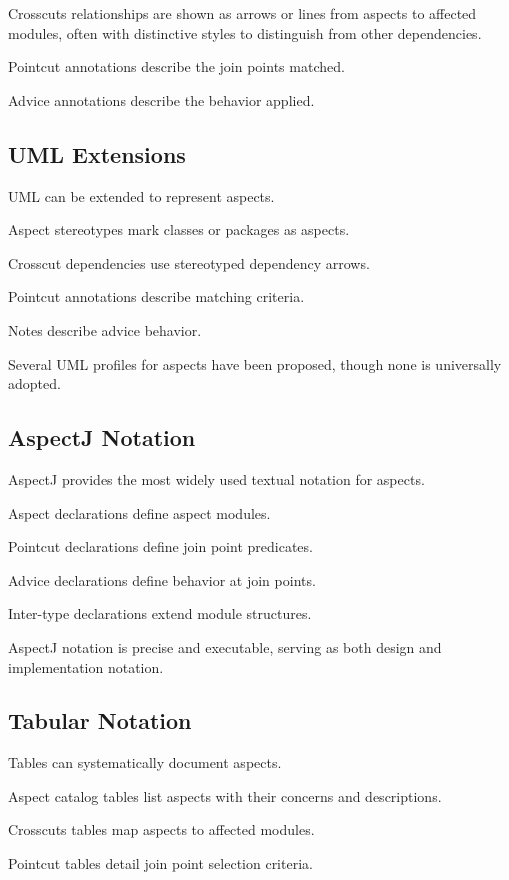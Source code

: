\documentclass[11pt]{article}
\begin{document}
Crosscuts relationships are shown as arrows or lines from aspects to affected modules, often with distinctive styles to distinguish from other dependencies.

Pointcut annotations describe the join points matched.

Advice annotations describe the behavior applied.

\subsection{UML Extensions}

UML can be extended to represent aspects.

Aspect stereotypes mark classes or packages as aspects.

Crosscut dependencies use stereotyped dependency arrows.

Pointcut annotations describe matching criteria.

Notes describe advice behavior.

Several UML profiles for aspects have been proposed, though none is universally adopted.

\subsection{AspectJ Notation}

AspectJ provides the most widely used textual notation for aspects.

Aspect declarations define aspect modules.

Pointcut declarations define join point predicates.

Advice declarations define behavior at join points.

Inter-type declarations extend module structures.

AspectJ notation is precise and executable, serving as both design and implementation notation.

\subsection{Tabular Notation}

Tables can systematically document aspects.

Aspect catalog tables list aspects with their concerns and descriptions.

Crosscuts tables map aspects to affected modules.

Pointcut tables detail join point selection criteria.
\end{document}
